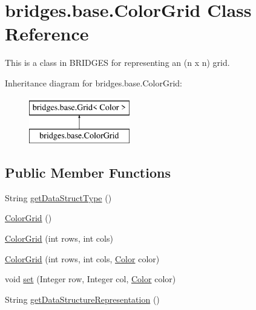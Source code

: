 \hypertarget{classbridges_1_1base_1_1_color_grid}{}\section{bridges.\+base.\+Color\+Grid Class Reference}
\label{classbridges_1_1base_1_1_color_grid}


This is a class in B\+R\+I\+D\+G\+ES for representing an (n x n) grid.  


Inheritance diagram for bridges.\+base.\+Color\+Grid\+:\begin{figure}[H]
\begin{center}
\leavevmode
\includegraphics[height=2.000000cm]{classbridges_1_1base_1_1_color_grid}
\end{center}
\end{figure}
\subsection*{Public Member Functions}
\begin{DoxyCompactItemize}
\item 
String \mbox{\hyperlink{classbridges_1_1base_1_1_color_grid_a53a1f3f105f8545796f98e5fac559b5b}{get\+Data\+Struct\+Type}} ()
\item 
\mbox{\hyperlink{classbridges_1_1base_1_1_color_grid_af434a5a3dcbaf86e51ac6f9e1c1d7e5f}{Color\+Grid}} ()
\item 
\mbox{\hyperlink{classbridges_1_1base_1_1_color_grid_aafb4157a4c8129f30c1f989fcdfda544}{Color\+Grid}} (int rows, int cols)
\item 
\mbox{\hyperlink{classbridges_1_1base_1_1_color_grid_aef40242c93b66ab851e6afa64cada0b5}{Color\+Grid}} (int rows, int cols, \mbox{\hyperlink{classbridges_1_1base_1_1_color}{Color}} color)
\item 
void \mbox{\hyperlink{classbridges_1_1base_1_1_color_grid_a93b29af9bb21b2bf6e52bc3fda9ff34a}{set}} (Integer row, Integer col, \mbox{\hyperlink{classbridges_1_1base_1_1_color}{Color}} color)
\item 
String \mbox{\hyperlink{classbridges_1_1base_1_1_color_grid_a81ca0995d17b6cb31122b718dfa57286}{get\+Data\+Structure\+Representation}} ()
\end{DoxyCompactItemize}
